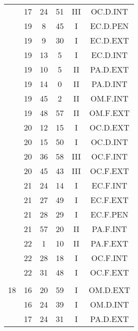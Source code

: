 \documentclass[12pt, a4paper]{article}
\begin{document}
\begin{multicols}{3}
{\begin{tabular}{c c c c c c}
	 	 	 	 & 17 & 24 & 51 & III & OC.D.INT\\%
	 	 	 	 & 19 & 8 & 45 & I & EC.D.PEN\\%
	 	 	 	 & 19 & 9 & 30 & I & EC.D.EXT\\%
	 	 	 	 & 19 & 13 & 5 & I & EC.D.INT\\%
	 	 	 	 & 19 & 10 & 5 & II & PA.D.EXT\\%
	 	 	 	 & 19 & 14 & 0 & II & PA.D.INT\\%
	 	 	 	 & 19 & 45 & 2 & II & OM.F.INT\\%
	 	 	 	 & 19 & 48 & 57 & II & OM.F.EXT\\%
	 	 	 	 & 20 & 12 & 15 & I & OC.D.EXT\\%
	 	 	 	 & 20 & 15 & 50 & I & OC.D.INT\\%
	 	 	 	 & 20 & 36 & 58 & III & OC.F.INT\\%
	 	 	 	 & 20 & 45 & 43 & III & OC.F.EXT\\%
	 	 	 	 & 21 & 24 & 14 & I & EC.F.INT\\%
	 	 	 	 & 21 & 27 & 49 & I & EC.F.EXT\\%
	 	 	 	 & 21 & 28 & 29 & I & EC.F.PEN\\%
	 	 	 	 & 21 & 57 & 20 & II & PA.F.INT\\%
	 	 	 	 & 22 & 1 & 10 & II & PA.F.EXT\\%
	 	 	 	 & 22 & 28 & 18 & I & OC.F.INT\\%
	 	 	 	 & 22 & 31 & 48 & I & OC.F.EXT\\%
	 	 	 	 & & & & & \\%
	 	 	 	18 & 16 & 20 & 59 & I & OM.D.EXT\\%
	 	 	 	 & 16 & 24 & 39 & I & OM.D.INT\\%
	 	 	 	 & 17 & 24 & 31 & I & PA.D.EXT\\%

\end{tabular}}
\end{multicols}
\end{document}
